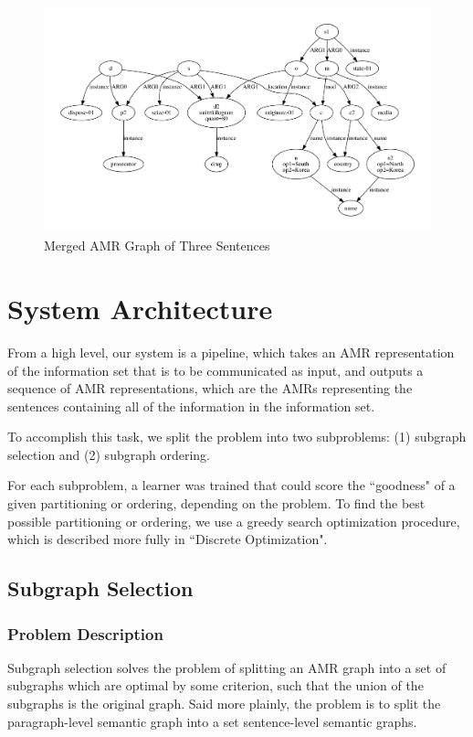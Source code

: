 \documentclass[12pt]{article}
\begin{document}
\begin{figure}
\includegraphics[width=\linewidth]{amr_example_3_merged.pdf}
\caption{Merged AMR Graph of Three Sentences}
\label{fig:amr_example_3_merged}
\end{figure}

\section{System Architecture}

From a high level, our system is a pipeline, which takes an AMR representation
of the information set that is to be communicated as input, and outputs a
sequence of AMR representations, which are the AMRs representing the sentences
containing all of the information in the information set.

To accomplish this task, we split the problem into two subproblems: (1)
subgraph selection and (2) subgraph ordering.

For each subproblem, a learner was trained that could score the ``goodness" of
a given partitioning or ordering, depending on the problem. To find the best
possible partitioning or ordering, we use a greedy search optimization
procedure, which is described more fully in ``Discrete Optimization".

\subsection{Subgraph Selection}
\subsubsection{Problem Description}

Subgraph selection solves the problem of splitting an AMR graph into a set of
subgraphs which are optimal by some criterion, such that the union of the
subgraphs is the original graph. Said more plainly, the problem is to split the paragraph-level semantic graph 
into a set sentence-level semantic graphs.
\end{document}

